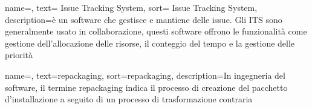 {
name=,
text= Issue Tracking System,
sort= Issue Tracking System,
description={è un software che gestisce e mantiene delle issue.
Gli ITS sono generalmente usato in collaborazione, questi software offrono le funzionalità come gestione dell'allocazione delle risorse, il conteggio del tempo e la gestione delle priorità}
}





{
name=,
text=repackaging,
sort=repackaging,
description={In ingegneria del software, il termine repackaging indica il processo di creazione del pacchetto d'installazione a seguito di un processo di trasformazione contraria}
}

